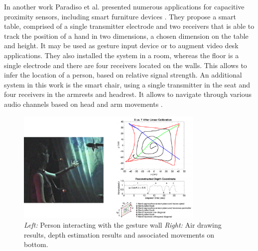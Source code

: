 In another work Paradiso et al. presented numerous applications for capacitive proximity sensors, including smart furniture devices \cite{ Zimmerman1995}. They propose a smart table, comprised of a single transmitter electrode and two receivers that is able to track the position of a hand in two dimensions, a chosen dimension on the table and height. It may be used as gesture input device or to augment video desk applications. They also installed the system in a room, whereas the floor is a single electrode and there are four receivers located on the walls. This allows to infer the location of a person, based on relative signal strength. An additional system in this work is the smart chair, using a single transmitter in the seat and four receivers in the armrests and headrest. It allows to navigate through various audio channels based on head and arm movements \cite{ schmandt1995audiostreamer}.
\begin{figure}[h]
\centering
\includegraphics[width=0.8\textwidth]{images/related_gesture_wall}
\caption{\emph{Left:} Person interacting with the gesture wall  \emph{Right:} Air drawing results, depth estimation results and associated movements on bottom. \cite{smith1998electric}}
\label{fig:related_gesture_wall}
\end{figure}

